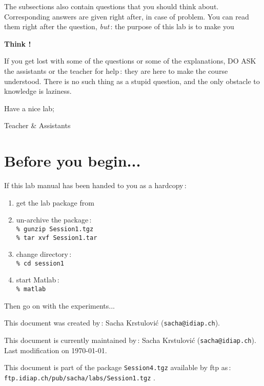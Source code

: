 \documentclass[twoside,a4paper,titlepage]{article}
\begin{document}
The subsections also contain questions that you should think about.
Corresponding answers are given right after, in case of problem. You can
read them right after the question, {\em but}\,: the purpose of this lab is
to make you

\medskip
\centerline{\LARGE \bf Think !}
\medskip

If you get lost with some of the questions or some of the explanations, DO
ASK the assistants or the teacher for help\,: they are here to make the course
understood. There is no such thing as a stupid question, and the only
obstacle to knowledge is laziness.

\bigskip
Have a nice lab;

\hfill Teacher \& Assistants \hspace{2cm}


\vfill
\section*{Before you begin...}
If this lab manual has been handed to you as a hardcopy\,:
\begin{enumerate}
\item get the lab package from \\
	\hspace{2cm}{\tt ftp.idiap.ch/pub/sacha/labs/Session1.tgz}
\item un-archive the package\,: \\
	{\tt \% gunzip Session1.tgz \\
	\% tar xvf Session1.tar}
\item change directory\,: \\
	{\tt \% cd session1}
\item start {\sc Matlab}\,: \\
	{\tt \% matlab }
\end{enumerate}
Then go on with the experiments...


\vspace{1cm}

{\scriptsize
\noindent
This document was created by\,: Sacha Krstulovi\'c ({\tt sacha@idiap.ch}).

\noindent
This document is currently maintained by\,: Sacha Krstulovi\'c ({\tt sacha@idiap.ch}). Last modification on \today.

\noindent
This document is part of the package {\tt Session4.tgz} available by ftp as\,: {\tt ftp.idiap.ch/pub/sacha/labs/Session1.tgz} .
}
\end{document}
